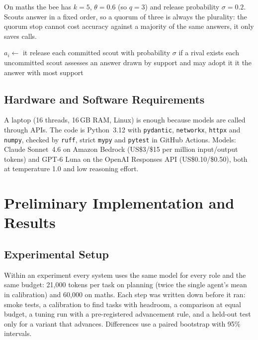 \documentclass[12pt,a4paper]{article}
\begin{document}
On maths the bee has $k=5$, $\theta=0.6$ (so $q=3$) and release probability $\sigma=0.2$. Scouts answer in
a fixed order, so a quorum of three is always the plurality: the quorum stop cannot cost accuracy against
a majority of the same answers, it only saves calls.

\begin{algorithm}[H]
\caption{Quorum bee on one subtask $v$}
\label{alg:bee}
\small
\begin{algorithmic}[1]
  \State $a_i \gets$ 
   \State \Return it \EndIf
\EndFor
{}
  \State release each committed scout with probability $\sigma$ if a rival exists 
  \State each uncommitted scout assesses an answer drawn by support and may adopt it 
   \State \Return it \EndIf
\EndFor
\State \Return the answer with most support
\end{algorithmic}
\end{algorithm}

\subsection{Hardware and Software Requirements}
A laptop (16 threads, 16\,GB RAM, Linux) is enough because models are called through APIs. The code is
Python~3.12 with \texttt{pydantic}, \texttt{networkx}, \texttt{httpx} and \texttt{numpy}, checked by
\texttt{ruff}, strict \texttt{mypy} and \texttt{pytest} in GitHub Actions. Models: Claude Sonnet~4.6 on
Amazon Bedrock (US\$3/\$15 per million input/output tokens) and GPT-6 Luna on the OpenAI Responses API
(US\$0.10/\$0.50), both at temperature 1.0 and low reasoning effort.

\section{Preliminary Implementation and Results}
\label{sec:results}

\subsection{Experimental Setup}
Within an experiment every system uses the same model for every role and the same budget: 21,000 tokens
per task on planning (twice the single agent's mean in calibration) and 60,000 on maths. Each step was
written down before it ran: smoke tests, a calibration to find tasks with headroom, a comparison at equal
budget, a tuning run with a pre-registered advancement rule, and a held-out test only for a variant that
advances. Differences use a paired bootstrap with 95\% intervals.
\end{document}
